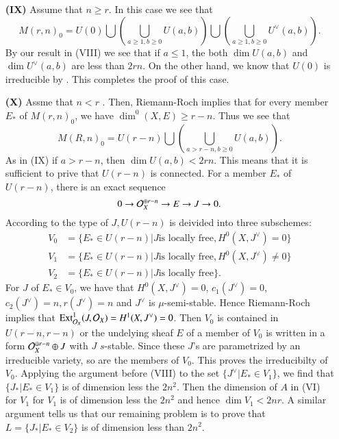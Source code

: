 \begin{itemize}
\item [\bf(IX)] Assume that $n \geq r$. In this case we see that
$$
M(r, n)_{0} = U(0)\bigcup\left(\bigcup\limits_{a \geq 1, b \geq 0} U(a, b)\right) \bigcup \left(\bigcup\limits_{a \geq 1, b \geq 0} U^{\vee}(a, b)\right).
$$
By our result in (VIII) we see that if $a \leq 1$, the both $\dim U(a, b)$ and $\dim U^{\vee}(a,b)$ are less than $2rn$. On the other hand, we know that $U(0)$ is irreducible by \cite{art12-key3}. This completes the proof of this case.

\item [\bf(X)] Assme that $n < r$ . Then, Riemann-Roch implies that for every member $E_{*}$ of $M(r, n)_{0}$, we have
 $\dim^{0}(X, E) \geq r-n$. Thus we see that
 $$
 M(R, n)_{0} = U(r-n)\bigcup \left(\bigcup\limits_{a>r-n,b\geq 0} U(a, b)\right).
 $$
As in (IX) if $a > r-n$, then $\dim U(a, b)< 2rn$. This  means that it is sufficient to prive that $U(r-n)$ is connected. For a member $E_{*}$ of $U(r-n)$, there is an exact sequence
$$
0 \rightarrow \mathcal{O}_{X}^{\oplus r-n} \rightarrow E\rightarrow J \rightarrow 0.
$$
According to the type of $J, U(r-n)$ is deivided into three subschemes:
\begin{align*}
V_{0}&=\{E_{*} \in U(r-n) | J \text{is locally free}, H^{0}(X, J^{\vee})=0\}\\
V_{1}&=\{E_{*} \in U(r-n) | J \text{is locally free}, H^{0}(X, J^{\vee})\neq 0\}\\
V_{2}&=\{E_{*} \in U(r-n) | J \text{is locally free} \}.
\end{align*}
For $J$ of $E_{*} \in V_{0}$, we have that $H^{0}(X, J^{\vee})=0$, $c_{1}(J^{\vee})=0$, $c_{2}(J^{\vee})=n, r(J^{\vee})=n$ and $J^{\vee}$ is $\mu$-semi-stable. Hence Riemann-Roch implies that $\operatorname{Ext}_{\mathcal{O}_{X}}^{1}(J, \mathcal{O}_{X})=H^{1}(X, J^{\vee})=0$. Then $V_{0}$ is contained in $U(r-n, r-n)$ or the undelying sheaf $E$ of a member of $V_{0}$ is written in a form $\mathcal{O}_{X}^{\oplus r-n} \oplus J$ with $J$  $s$-stable. Since these $J$'s are parametrized by an irreducible variety, so are the members of $V_{0}$. This proves the irreducibilty of $V_{0}$. Applying the argument before (VIII) to the set $\{J^{\vee} | E_{*} \in V_{1}\}$, we find that $\{J_{*} | E_{*} \in V_{1}\}$ is of dimension less the $2n^{2}$. Then the dimension of $A$ in (VI) for $V_{1}$ for $V_{1}$ is of dimension less the $2n^{2}$ and hence $\dim V_{1}< 2nr$. A similar argument tells us that our remaining problem is to prove that $L=\{J_{*} |E_{*} \in V_{2}\}$ is of dimension less than $2n^{2}$.


\end{itemize}
